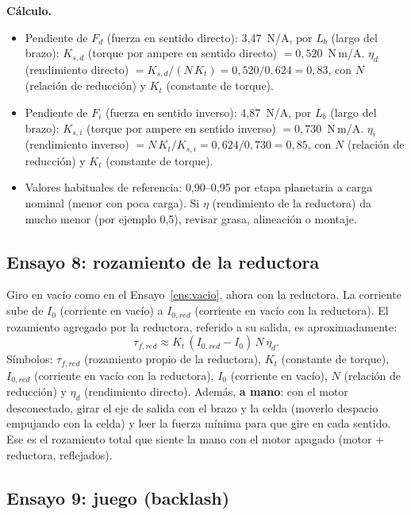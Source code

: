 \documentclass[11pt,a4paper]{article}
\begin{document}
\textbf{Cálculo.}
\begin{itemize}
\item Pendiente de $F_d$ (fuerza en sentido directo): 3,47~N/A, por $L_b$ (largo del brazo): $K_{s,d}$ (torque por ampere en sentido directo) $= 0{,}520$~N\,m/A. $\eta_d$ (rendimiento directo) $= K_{s,d}/(N\,K_t) = 0{,}520/0{,}624 = 0{,}83$, con $N$ (relación de reducción) y $K_t$ (constante de torque).
\item Pendiente de $F_i$ (fuerza en sentido inverso): 4,87~N/A, por $L_b$ (largo del brazo): $K_{s,i}$ (torque por ampere en sentido inverso) $= 0{,}730$~N\,m/A. $\eta_i$ (rendimiento inverso) $= N\,K_t/K_{s,i} = 0{,}624/0{,}730 = 0{,}85$, con $N$ (relación de reducción) y $K_t$ (constante de torque).
\item Valores habituales de referencia: 0,90--0,95 por etapa planetaria a carga nominal (menor con poca carga). Si $\eta$ (rendimiento de la reductora) da mucho menor (por ejemplo 0,5), revisar grasa, alineación o montaje.
\end{itemize}

\subsection{Ensayo 8: rozamiento de la reductora}

Giro en vacío como en el Ensayo~\ref{ens:vacio}, ahora con la reductora. La corriente sube de $I_0$ (corriente en vacío) a $I_{0,red}$ (corriente en vacío con la reductora). El rozamiento agregado por la reductora, referido a su salida, es aproximadamente:
\[
\tau_{f,red} \approx K_t\,(I_{0,red} - I_0)\,N\,\eta_d .
\]
Símbolos: $\tau_{f,red}$ (rozamiento propio de la reductora), $K_t$ (constante de torque), $I_{0,red}$ (corriente en vacío con la reductora), $I_0$ (corriente en vacío), $N$ (relación de reducción) y $\eta_d$ (rendimiento directo). Además, \textbf{a mano}: con el motor desconectado, girar el eje de salida con el brazo y la celda (moverlo despacio empujando con la celda) y leer la fuerza mínima para que gire en cada sentido. Ese es el rozamiento total que siente la mano con el motor apagado (motor + reductora, reflejados).

\subsection{Ensayo 9: juego (backlash)}
\end{document}
